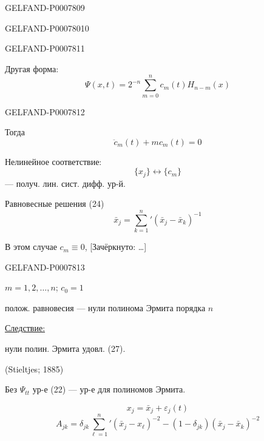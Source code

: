 \begin{GelfandAdjacentEvidence}{GELFAND-P000780}{9}

\end{GelfandAdjacentEvidence}
\begin{GelfandAdjacentEvidence}{GELFAND-P000780}{10}

\end{GelfandAdjacentEvidence}



\begin{GelfandAdjacentEvidence}{GELFAND-P000781}{1}

Другая форма:
\begin{equation}
\Psi(x,t)=2^{-n}\sum_{m=0}^n c_m(t)H_{n-m}(x)\tag{25}
\end{equation}
\end{GelfandAdjacentEvidence}
\begin{GelfandAdjacentEvidence}{GELFAND-P000781}{2}


Тогда
\begin{equation}
\ddot c_m(t)+mc_m(t)=0\tag{26}
\end{equation}

Нелинейное соответствие:
\[
\{x_j\}\leftrightarrow\{c_m\}
\]
 --- получ. лин. сист. дифф. ур-й.

Равновесные решения (24)
\begin{equation}
\bar x_j=\sum_{k=1}^n{}'(\bar x_j-\bar x_k)^{-1}\tag{27}
\end{equation}

В этом случае \(c_m\equiv0\),
[Зачёркнуто: …]
\end{GelfandAdjacentEvidence}
\begin{GelfandAdjacentEvidence}{GELFAND-P000781}{3}

\(m=1,2,\ldots,n\); \(c_0=1\)

полож. равновесия --- нули полинома Эрмита порядка \(n\)

\underline{Следствие:}

нули полин. Эрмита удовл. (27).

(Stieltjes; 1885)

Без \(\Psi_{tt}\) ур-е (22) --- ур-е для полиномов Эрмита.

\begin{equation}
x_j=\bar x_j+\varepsilon_j(t)\tag{28}
\end{equation}
\[
A_{jk}=\delta_{jk}\sum_{\ell=1}^n{}'
(\bar x_j-x_\ell)^{-2}
-(1-\delta_{jk})(\bar x_j-\bar x_k)^{-2}
\]
\end{GelfandAdjacentEvidence}
